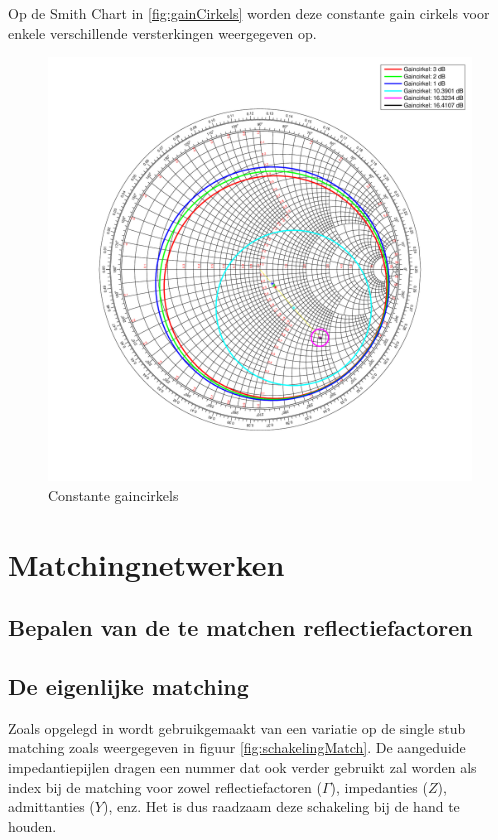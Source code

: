   Op de Smith Chart \cite{smithchart} in \autoref{fig:gainCirkels} worden deze
  constante gain cirkels voor enkele verschillende
  versterkingen weergegeven op.
  \begin{figure}[!h]
      \centering
      \includegraphics[width=\textwidth,keepaspectratio=true]{fig/gaincirkels.pdf}  
      \caption{Constante gaincirkels} 
      \label{fig:gainCirkels}
    \end{figure}
  

\section{Matchingnetwerken}

  \subsection{Bepalen van de te matchen reflectiefactoren}
  \subsection{De eigenlijke matching}
  Zoals opgelegd in \cite{lesWendy} wordt gebruikgemaakt van een variatie op de
  single stub matching zoals weergegeven in figuur \ref{fig:schakelingMatch}.
  De aangeduide impedantiepijlen dragen een nummer dat ook verder gebruikt zal
  worden als index bij de matching voor zowel reflectiefactoren ($\Gamma$),
  impedanties ($Z$), admittanties ($Y$), enz. Het is dus raadzaam deze schakeling bij de
  hand te houden. 

